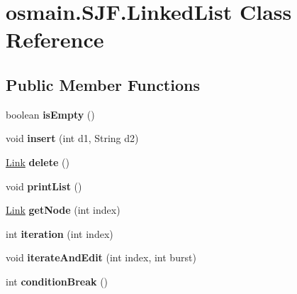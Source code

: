 \hypertarget{classosmain_1_1_s_j_f_1_1_linked_list}{}\section{osmain.\+S\+J\+F.\+Linked\+List Class Reference}
\label{classosmain_1_1_s_j_f_1_1_linked_list}
\subsection*{Public Member Functions}
\begin{DoxyCompactItemize}
\item 
boolean {\bfseries is\+Empty} ()\hypertarget{classosmain_1_1_s_j_f_1_1_linked_list_a083b2532c22e0f0ac49fdb8170cd71f4}{}\label{classosmain_1_1_s_j_f_1_1_linked_list_a083b2532c22e0f0ac49fdb8170cd71f4}

\item 
void {\bfseries insert} (int d1, String d2)\hypertarget{classosmain_1_1_s_j_f_1_1_linked_list_ab007ad40f332e3c50ca3e4dec0385060}{}\label{classosmain_1_1_s_j_f_1_1_linked_list_ab007ad40f332e3c50ca3e4dec0385060}

\item 
\hyperlink{classosmain_1_1_s_j_f_1_1_link}{Link} {\bfseries delete} ()\hypertarget{classosmain_1_1_s_j_f_1_1_linked_list_ad12d2d1b168e75b61925703b7e3ba8b1}{}\label{classosmain_1_1_s_j_f_1_1_linked_list_ad12d2d1b168e75b61925703b7e3ba8b1}

\item 
void {\bfseries print\+List} ()\hypertarget{classosmain_1_1_s_j_f_1_1_linked_list_a2eda28b0c4e5e582d0727bf665e0c62d}{}\label{classosmain_1_1_s_j_f_1_1_linked_list_a2eda28b0c4e5e582d0727bf665e0c62d}

\item 
\hyperlink{classosmain_1_1_s_j_f_1_1_link}{Link} {\bfseries get\+Node} (int index)\hypertarget{classosmain_1_1_s_j_f_1_1_linked_list_a2c889c35e68c3e840db8c5d01b7d3cc7}{}\label{classosmain_1_1_s_j_f_1_1_linked_list_a2c889c35e68c3e840db8c5d01b7d3cc7}

\item 
int {\bfseries iteration} (int index)\hypertarget{classosmain_1_1_s_j_f_1_1_linked_list_aee480a49cc6767de811308237afc8b24}{}\label{classosmain_1_1_s_j_f_1_1_linked_list_aee480a49cc6767de811308237afc8b24}

\item 
void {\bfseries iterate\+And\+Edit} (int index, int burst)\hypertarget{classosmain_1_1_s_j_f_1_1_linked_list_a7bc15df54c052e17b513a169a9e61efd}{}\label{classosmain_1_1_s_j_f_1_1_linked_list_a7bc15df54c052e17b513a169a9e61efd}

\item 
int {\bfseries condition\+Break} ()\hypertarget{classosmain_1_1_s_j_f_1_1_linked_list_a257f8b6948606bf94f52f486e95e1a09}{}\label{classosmain_1_1_s_j_f_1_1_linked_list_a257f8b6948606bf94f52f486e95e1a09}

\end{DoxyCompactItemize}


